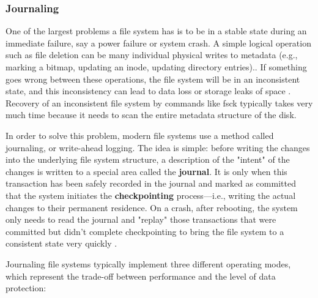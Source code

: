 \documentclass[12pt]{article}
\begin{document}
\subsubsection{Journaling}
One of the largest problems a file system has is to be in a stable state during an immediate failure, say a power failure or system crash. A simple logical operation such as file deletion can be many individual physical writes to metadata (e.g., marking a bitmap, updating an inode, updating directory entries).. If something goes wrong between these operations, the file system will be in an inconsistent state, and this inconsistency can lead to data loss or storage leaks of space \parencite{LibreTextsJournaling}. Recovery of an inconsistent file system by commands like fsck typically takes very much time because it needs to scan the entire metadata structure of the disk.

In order to solve this problem, modern file systems use a method called journaling, or write-ahead logging. The idea is simple: before writing the changes into the underlying file system structure, a description of the "intent" of the changes is written to a special area called the \textbf{journal}. It is only when this transaction has been safely recorded in the journal and marked as committed that the system initiates the \textbf{checkpointing} process—i.e., writing the actual changes to their permanent residence. On a crash, after rebooting, the system only needs to read the journal and "replay" those transactions that were committed but didn't complete checkpointing to bring the file system to a consistent state very quickly \parencite{Prabhakaran2005journaling, Jones2008Anatomy}.

Journaling file systems typically implement three different operating modes, which represent the trade-off between performance and the level of data protection:
\end{document}
